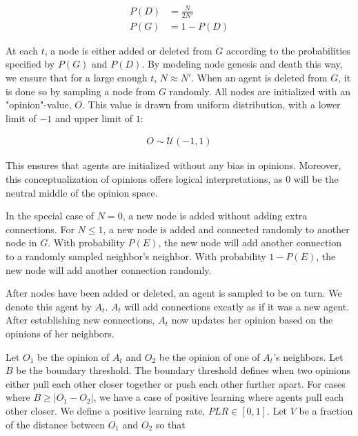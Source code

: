 \documentclass[9pt,twocolumn,twoside]{ilcss}
\begin{document}
\begin{figure}[h]
	\begin{align*}
	P(D)& = \frac{N}{2N'}\\
	P(G)& = 1 - P(D)
	\end{align*}
\end{figure}

At each $t$, a node is either added or deleted from $G$ according to the probabilities specified by $P(G)$ and $P(D)$.
By modeling node genesis and death this way, we ensure that for a large enough $t$, $N \approx N'$.
When an agent is deleted from $G$, it is done so by sampling a node from $G$ randomly.
All nodes are initialized with an "opinion"-value, $O$. This value is drawn from uniform distribution, with a lower limit of $-1$ and upper limit of $1$:

\begin{figure}[h]
	\begin{align*}
	O \sim \mathcal{U}(-1, 1)
	\end{align*}
\end{figure}

This ensures that agents are initialized without any bias in opinions.
Moreover, this conceptualization of opinions offers logical interpretations, as $0$ will be the neutral middle of the opinion space. 

In the special case of $N = 0$, a new node is added without adding extra connections. 
For $N \leq 1$, a new node is added and connected randomly to another node in $G$.
With probability $P(E)$, the new node will add another connection to a randomly sampled neighbor's neighbor.
With probability $1 - P(E)$, the new node will add another connection randomly. 

After nodes have been added or deleted, an agent is sampled to be on turn. We denote this agent by $A_t$. 
$A_t$ will add connections excatly as if it was a new agent. After establishing new connections,
$A_t$ now updates her opinion based on the opinions of her neighbors. 

Let $O_1$ be the opinion of $A_t$ and $O_2$ be the opinion of one of $A_t$'s neighbors. 
Let $B$ be the boundary threshold. The boundary threshold defines when two opinions either pull each other closer together or push each other further apart.
For cases where $B \geq |O_1 - O_2|$, we have a case of positive learning where agents pull each other closer. We define a positive learning rate, $PLR \in [0, 1]$. Let $V$ be a fraction of the distance between $O_1$ and $O_2$ so that
\end{document}
